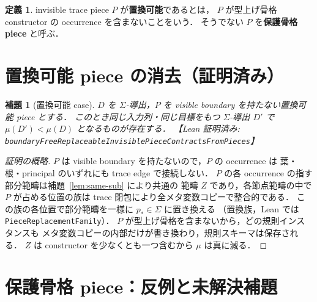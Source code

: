 \documentclass[paper=a4,fontsize=10pt,jafontscale=0.92]{jlreq}
\theoremstyle{plain}
\newtheorem{lemma}[theorem]{補題}
\theoremstyle{definition}
\newtheorem{definition}[theorem]{定義}
\theoremstyle{remark}
\newcommand{\Sig}{\Sigma}
\newcommand{\lean}[1]{\texttt{#1}}
\begin{document}
\begin{definition}
invisible trace piece $P$ が\textbf{置換可能}であるとは，
$P$ が型上げ骨格 constructor の occurrence を含まないことをいう．
そうでない $P$ を\textbf{保護骨格 piece} と呼ぶ．
\end{definition}

\section{置換可能 piece の消去（証明済み）}

\begin{lemma}[置換可能 case]
\label{lem:replaceable}
$D$ を $\Sig$-導出，$P$ を visible boundary を持たない置換可能 piece とする．
このとき同じ入力列・同じ目標をもつ $\Sig$-導出 $D'$ で
$\mu(D') < \mu(D)$ となるものが存在する．
【Lean 証明済み:
\lean{boundaryFreeReplaceableInvisiblePieceContractsFromPieces}】
\end{lemma}

\begin{proof}[証明の概略]
$P$ は visible boundary を持たないので，$P$ の occurrence は
葉・根・principal のいずれにも trace edge で接続しない．
$P$ の各 occurrence の指す部分範疇は補題~\ref{lem:same-sub} により共通の
範疇 $Z$ であり，各節点範疇の中で $P$ が占める位置の族は
trace 閉包により全メタ変数コピーで整合的である．
この族の各位置で部分範疇を一様に $p_\ast \in \Sig$ に置き換える
（置換族，Lean では \lean{PieceReplacementFamily}）．
$P$ が型上げ骨格を含まないから，どの規則インスタンスも
メタ変数コピーの内部だけが書き換わり，規則スキーマは保存される．
$Z$ は constructor を少なくとも一つ含むから $\mu$ は真に減る．
\end{proof}

\section{保護骨格 piece：反例と未解決補題}
\label{sec:protected}
\end{document}
